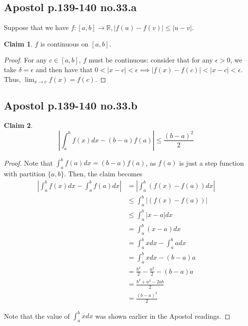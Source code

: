 \documentclass[12pt,letterpaper]{article}
\theoremstyle{definition}
\newtheorem*{claim}{Claim}
\newcommand{\R}{\mathbb{R}}
\begin{document}
\subsection*{Apostol p.139-140 no.33.a}

Suppose that we have $f:[a,b] \rightarrow \R, |f(u)-f(v)| \leq |u-v|$.

\begin{claim}
  $f$ is continuous on $[a,b]$.
\end{claim}

\begin{proof}
  For any $c \in [a,b]$, $f$ must be continuous: consider that for any $\epsilon
  > 0$, we take $\delta = \epsilon$ and then have that $0 < |x - c| < \epsilon
  \implies |f(x) - f(c)| < |x - c| < \epsilon$. Thus, $\lim_{x\rightarrow c}f(x)
  = f(c)$.
\end{proof}

\subsection*{Apostol p.139-140 no.33.b}

\begin{claim}
  \[
    \left| \int_a^bf(x)dx - (b-a)f(a) \right| \leq \frac{(b-a)^2}{2}
  \]
\end{claim}

\begin{proof}
  Note that $\int_a^bf(a)dx = (b-a)f(a)$, as $f(a)$ is just a step function with
  partition $\{a,b\}$. Then, the claim becomes
  \begin{align*}
    \left|\int_a^bf(x)dx - \int_a^bf(a)dx\right| &= \left|\int_a^b(f(x) - f(a))dx\right| \\
                                                 &\leq \int_a^b|(f(x) - f(a))| \\
                                                 &\leq \int_a^b|x - a|dx \\
                                                 &= \int_a^b(x-a)dx \\
                                                 &= \int_a^bxdx - \int_a^badx \\
                                                 &= \int_a^b xdx - (b-a)a \\
                                                 &= \frac{b^2}{2} - \frac{a^2}{2} - (b-a)a \\
                                                 &= \frac{b^2 + a^2 -2ab}{2} \\
                                                 &= \frac{(b-a)^2}{2}
  \end{align*}

  Note that the value of $\int_a^bxdx$ was shown earlier in the Apostol readings.
\end{proof}
\end{document}
